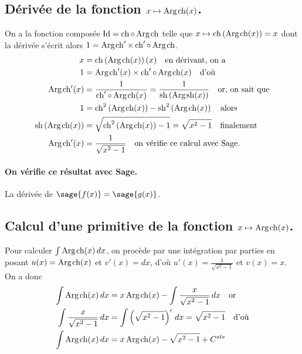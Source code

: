 \documentclass[a4paper,12pt]{report}
\def\Id{\ensuremath{\mathrm{Id}}}
\renewcommand{\sinh}{\mathop{\mathrm{sh}}}
\renewcommand{\cosh}{\mathop{\mathrm{ch}}}
\renewcommand{\arg}{\mathop{\mathrm{Arg}}}
\begin{document}
\subsection{Dérivée de la fonction $x \mapsto \arg\mspace{-1mu}\cosh(x)$.\label{argcosh}}
On a la fonction composée $\Id = \cosh \circ \arg\mspace{-1mu}\cosh$ telle que $x\mapsto\cosh\left(\arg\mspace{-1mu}\cosh(x)\right)=x$ dont la dérivée s'écrit alors $1= \arg\mspace{-1mu}\cosh\nolimits' \times \cosh\nolimits'\circ\arg\mspace{-1mu}\cosh$.
\begin{align*}
x & =\cosh\left(\arg\mspace{-1mu}\cosh(x)\right)(x) \quad \textrm{en dérivant, on a}\\
1 & = \arg\mspace{-1mu}\cosh\nolimits'(x) \times \cosh\nolimits'\circ\arg\mspace{-1mu}\cosh(x) \quad \textrm{d'où}\\
\arg\mspace{-1mu}\cosh\nolimits'(x) & =\frac{1}{ \cosh\nolimits'\circ\arg\mspace{-1mu}\cosh(x)}=\frac{1}{ \sinh\left(\arg\mspace{-1mu}\sinh(x)\right)}\quad \textrm{or, on sait que}\\
1 & = \cosh\nolimits^2\left(\arg\mspace{-1mu}\cosh(x)\right) - \sinh\nolimits^2\left(\arg\mspace{-1mu}\cosh(x)\right) \quad \textrm{alors}\\
\sinh\left(\arg\mspace{-1mu}\cosh(x)\right) & = \sqrt{\cosh\nolimits^2\left(\arg\mspace{-1mu}\cosh(x)\right)-1}=\sqrt{x^2-1}\quad \textrm{finalement}\\
\arg\mspace{-1mu}\cosh\nolimits'(x) & = \frac{1}{ \sqrt{x^2-1}}\quad \textrm{on vérifie ce calcul avec Sage.}
\end{align*}


\paragraph{On vérifie ce résultat avec Sage.}
La dérivée de $\sage{f(x)} = \sage{g(x)} $.


\subsection{Calcul d'une primitive de la fonction  $x \mapsto \arg\mspace{-1mu}\cosh(x)$.}
Pour calculer $\int \arg\mspace{-1mu}\cosh(x) \, dx$, on procède par une intégration par parties en posant $u(x) = \arg\mspace{-1mu}\cosh(x)$ et $v'(x) = dx$, d'où $u'(x) = \frac{1}{ \sqrt{x^2-1}}$ et $ v(x) = x $. \\
On a donc
\begin{align*}
\int \arg\mspace{-1mu}\cosh(x) \, dx & = x \arg\mspace{-1mu}\cosh(x) - \int \frac{x}{ \sqrt{x^2-1}} \, dx \quad \textrm{or}\\
\int \frac{x}{ \sqrt{x^2-1}} \, dx & = \int \left(\sqrt{x^2-1}\right)' \, dx = \sqrt{x^2-1}  \quad \textrm{d'où}\\
\int \arg\mspace{-1mu}\cosh(x) \, dx & = x \arg\mspace{-1mu}\cosh(x) - \sqrt{x^2-1} + C^{ste} 
\end{align*}
\end{document}
